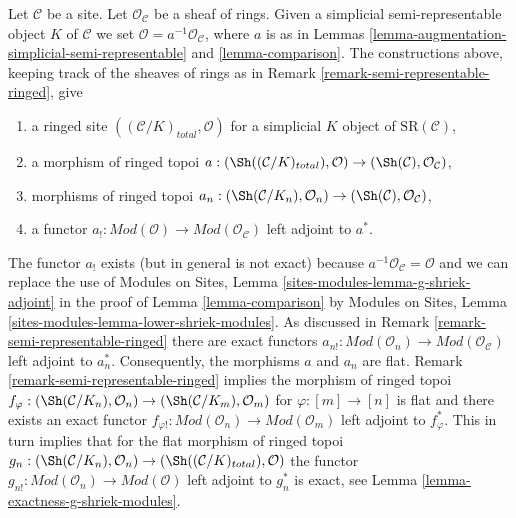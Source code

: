 \begin{remark}
\label{remark-augmentation-ringed}
Let $\mathcal{C}$ be a site. Let $\mathcal{O}_\mathcal{C}$ be a sheaf of rings.
Given a simplicial semi-representable object $K$ of $\mathcal{C}$
we set $\mathcal{O} = a^{-1}\mathcal{O}_\mathcal{C}$, where $a$
is as in Lemmas \ref{lemma-augmentation-simplicial-semi-representable} and
\ref{lemma-comparison}.
The constructions above, keeping track of the sheaves of rings
as in Remark \ref{remark-semi-representable-ringed}, give
\begin{enumerate}
\item a ringed site $((\mathcal{C}/K)_{total}, \mathcal{O})$
for a simplicial $K$ object of $\text{SR}(\mathcal{C})$,
\item a morphism of ringed topoi
$a : (\Sh((\mathcal{C}/K)_{total}), \mathcal{O}) \to
(\Sh(\mathcal{C}), \mathcal{O}_\mathcal{C})$,
\item morphisms of ringed topoi
$a_n : (\Sh(\mathcal{C}/K_n), \mathcal{O}_n) \to
(\Sh(\mathcal{C}), \mathcal{O}_\mathcal{C})$,
\item a functor
$a_! : \textit{Mod}(\mathcal{O}) \to \textit{Mod}(\mathcal{O}_\mathcal{C})$
left adjoint to $a^*$.
\end{enumerate}
The functor $a_!$ exists (but in general is not exact)
because $a^{-1}\mathcal{O}_\mathcal{C} = \mathcal{O}$
and we can replace the use of
Modules on Sites, Lemma \ref{sites-modules-lemma-g-shriek-adjoint}
in the proof of Lemma \ref{lemma-comparison}
by Modules on Sites, Lemma \ref{sites-modules-lemma-lower-shriek-modules}.
As discussed in Remark \ref{remark-semi-representable-ringed}
there are exact functors
$a_{n!} : \textit{Mod}(\mathcal{O}_n) \to
\textit{Mod}(\mathcal{O}_\mathcal{C})$
left adjoint to $a_n^*$. Consequently, the morphisms $a$ and $a_n$ are flat.
Remark \ref{remark-semi-representable-ringed}
implies the morphism of ringed topoi
$f_\varphi : (\Sh(\mathcal{C}/K_n), \mathcal{O}_n) \to
(\Sh(\mathcal{C}/K_m), \mathcal{O}_m)$
for $\varphi : [m] \to [n]$ is flat and there exists an exact functor
$f_{\varphi !} : \textit{Mod}(\mathcal{O}_n) \to \textit{Mod}(\mathcal{O}_m)$
left adjoint to $f_\varphi^*$. This in turn implies that for
the flat morphism of ringed topoi
$g_n : (\Sh(\mathcal{C}/K_n), \mathcal{O}_n) \to
(\Sh((\mathcal{C}/K)_{total}), \mathcal{O})$
the functor $g_{n!} : \textit{Mod}(\mathcal{O}_n) \to
\textit{Mod}(\mathcal{O})$ left adjoint to $g_n^*$ is exact, see
Lemma \ref{lemma-exactness-g-shriek-modules}.
\end{remark}


